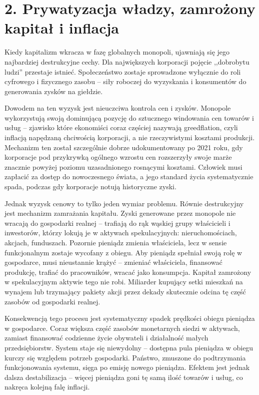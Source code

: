 \documentclass[12pt,a4paper]{article}
\begin{document}
\section*{2. Prywatyzacja władzy, zamrożony kapitał i inflacja}

Kiedy kapitalizm wkracza w fazę globalnych monopoli, ujawniają się jego najbardziej destrukcyjne cechy. Dla największych korporacji pojęcie ,,dobrobytu ludzi'' przestaje istnieć. Społeczeństwo zostaje sprowadzone wyłącznie do roli cyfrowego i fizycznego zasobu -- siły roboczej do wyzyskania i konsumentów do generowania zysków na giełdzie.

Dowodem na ten wyzysk jest nieuczciwa kontrola cen i zysków. Monopole wykorzystują swoją dominującą pozycję do sztucznego windowania cen towarów i usług -- zjawisko które ekonomiści coraz częściej nazywają greedflation, czyli inflacją napędzaną chciwością korporacji, a nie rzeczywistymi kosztami produkcji. Mechanizm ten został szczególnie dobrze udokumentowany po 2021 roku, gdy korporacje pod przykrywką ogólnego wzrostu cen rozszerzyły swoje marże znacznie powyżej poziomu uzasadnionego rosnącymi kosztami. Człowiek musi zapłacić za dostęp do nowoczesnego świata, a jego standard życia systematycznie spada, podczas gdy korporacje notują historyczne zyski.

Jednak wyzysk cenowy to tylko jeden wymiar problemu. Równie destrukcyjny jest mechanizm zamrażania kapitału. Zyski generowane przez monopole nie wracają do gospodarki realnej -- trafiają do rąk wąskiej grupy właścicieli i inwestorów, którzy lokują je w aktywach spekulacyjnych: nieruchomościach, akcjach, funduszach. Pozornie pieniądz zmienia właściciela, lecz w sensie funkcjonalnym zostaje wycofany z obiegu. Aby pieniądz spełniał swoją rolę w gospodarce, musi nieustannie krążyć -- zmieniać właściciela, finansować produkcję, trafiać do pracowników, wracać jako konsumpcja. Kapitał zamrożony w spekulacyjnym aktywie tego nie robi. Miliarder kupujący setki mieszkań na wynajem lub trzymający pakiety akcji przez dekady skutecznie odcina tę część zasobów od gospodarki realnej.

Konsekwencją tego procesu jest systematyczny spadek prędkości obiegu pieniądza w gospodarce. Coraz większa część zasobów monetarnych siedzi w aktywach, zamiast finansować codzienne życie obywateli i działalność małych przedsiębiorstw. System staje się niewydolny -- dostępna pula pieniądza w obiegu kurczy się względem potrzeb gospodarki. Państwo, zmuszone do podtrzymania funkcjonowania systemu, sięga po emisję nowego pieniądza. Efektem jest jednak dalsza destabilizacja -- więcej pieniądza goni tę samą ilość towarów i usług, co nakręca kolejną falę inflacji.
\end{document}
